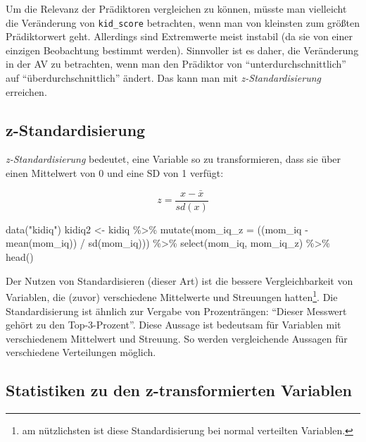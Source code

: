 \documentclass[
  a4paper,
  DIV=11]{scrreprt}
\newenvironment{Shaded}{\begin{snugshade}}{\end{snugshade}}
\newcommand{\AttributeTok}[1]{\textcolor[rgb]{0.40,0.45,0.13}{#1}}
\newcommand{\FunctionTok}[1]{\textcolor[rgb]{0.28,0.35,0.67}{#1}}
\newcommand{\NormalTok}[1]{\textcolor[rgb]{0.00,0.23,0.31}{#1}}
\newcommand{\OtherTok}[1]{\textcolor[rgb]{0.00,0.23,0.31}{#1}}
\newcommand{\SpecialCharTok}[1]{\textcolor[rgb]{0.37,0.37,0.37}{#1}}
\newcommand{\StringTok}[1]{\textcolor[rgb]{0.13,0.47,0.30}{#1}}
\theoremstyle{definition}
\theoremstyle{remark}
\begin{document}
Um die Relevanz der Prädiktoren vergleichen zu können, müsste man
vielleicht die Veränderung von \texttt{kid\_score} betrachten, wenn man
von kleinsten zum größten Prädiktorwert geht. Allerdings sind
Extremwerte meist instabil (da sie von einer einzigen Beobachtung
bestimmt werden). Sinnvoller ist es daher, die Veränderung in der AV zu
betrachten, wenn man den Prädiktor von ``unterdurchschnittlich'' auf
``überdurchschnittlich'' ändert. Das kann man mit
\emph{z-Standardisierung} erreichen.

\hypertarget{z-standardisierung}{%
\subsection{z-Standardisierung}\label{z-standardisierung}}

\emph{z-Standardisierung} bedeutet, eine Variable so zu transformieren,
dass sie über einen Mittelwert von 0 und eine SD von 1 verfügt:

\[z = \frac{x - \bar{x}}{sd(x)}\]

\begin{Shaded}
\begin{Highlighting}[]
\FunctionTok{data}\NormalTok{(}\StringTok{"kidiq"}\NormalTok{)}
\NormalTok{kidiq2 }\OtherTok{\textless{}{-}} 
\NormalTok{  kidiq }\SpecialCharTok{\%\textgreater{}\%} 
  \FunctionTok{mutate}\NormalTok{(}\AttributeTok{mom\_iq\_z =}\NormalTok{ ((mom\_iq }\SpecialCharTok{{-}} \FunctionTok{mean}\NormalTok{(mom\_iq)) }\SpecialCharTok{/} \FunctionTok{sd}\NormalTok{(mom\_iq)))  }\SpecialCharTok{\%\textgreater{}\%} 
  \FunctionTok{select}\NormalTok{(mom\_iq, mom\_iq\_z) }\SpecialCharTok{\%\textgreater{}\%} 
  \FunctionTok{head}\NormalTok{()}
\end{Highlighting}
\end{Shaded}

Der Nutzen von Standardisieren (dieser Art) ist die bessere
Vergleichbarkeit von Variablen, die (zuvor) verschiedene Mittelwerte und
Streuungen hatten\footnote{am nützlichsten ist diese Standardisierung
  bei normal verteilten Variablen.}. Die Standardisierung ist ähnlich
zur Vergabe von Prozenträngen: ``Dieser Messwert gehört zu den
Top-3-Prozent''. Diese Aussage ist bedeutsam für Variablen mit
verschiedenem Mittelwert und Streuung. So werden vergleichende Aussagen
für verschiedene Verteilungen möglich.

\hypertarget{statistiken-zu-den-z-transformierten-variablen}{%
\subsection{Statistiken zu den z-transformierten
Variablen}\label{statistiken-zu-den-z-transformierten-variablen}}
\end{document}
